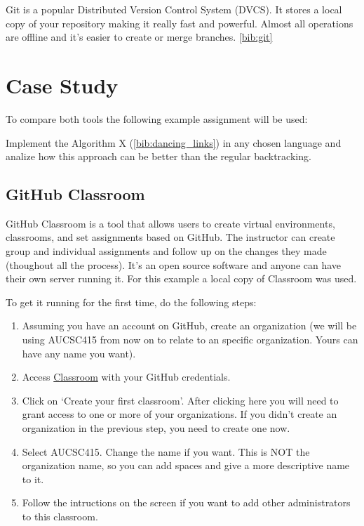 \documentclass[12pt]{article}
\begin{document}
Git is a popular Distributed Version Control System (DVCS). It stores a local copy of your repository making it really fast and powerful. Almost all operations are offline and it's easier to create or merge branches. \ref{bib:git}


\section{Case Study}

To compare both tools the following example assignment will be used: 

Implement the Algorithm X (\ref{bib:dancing_links}) in any chosen language and analize how this approach can be better than the regular backtracking.

\subsection{GitHub Classroom}

GitHub Classroom is a tool that allows users to create virtual environments, classrooms, and set assignments based on GitHub. The instructor can create group and individual assignments and follow up on the changes they made (thoughout all the process). It's an open source software and anyone can have their own server running it. For this example a local copy of Classroom was used.

To get it running for the first time, do the following steps:

\begin{enumerate}

\item Assuming you have an account on GitHub, create an organization (we will be using AUCSC415 from now on to relate to an specific organization. Yours can have any name you want).

\item Access \href{https://classroom.github.com}{Classroom} with your GitHub credentials. 

\item Click on `Create your first classroom'. After clicking here you will need to grant access to one or more of your organizations. If you didn't create an organization in the previous step, you need to create one now.

\item Select AUCSC415. Change the name if you want. This is NOT the organization name, so you can add spaces and give a more descriptive name to it.

\item Follow the intructions on the screen if you want to add other administrators to this classroom.

\end{enumerate}
\end{document}
